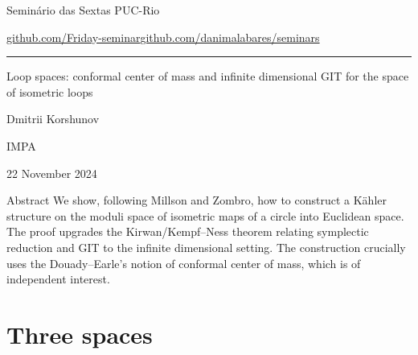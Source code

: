 


\begin{minipage}{\textwidth}
	\begin{minipage}{1\textwidth}
		Semin\'ario das Sextas \hfill PUC-Rio
		
		{\small\href{https://github.com/Friday-seminar/}{github.com/Friday-seminar}\hfill\href{https://github.com/danimalabares/seminars}{github.com/danimalabares/seminars}}
		\end{minipage}
\end{minipage}\vspace{.2cm}\hrule

\vspace{10pt}

{\Huge Loop spaces:}{\huge \hspace{.1em} conformal center of mass and infinite dimensional GIT for the space of isometric loops}

\hfill{\Large Dmitrii Korshunov}

\hfill{\Large IMPA}

\hfill{\large 22 November 2024}

\begin{thing4}{Abstract}
We show, following Millson and Zombro, how to construct a Kähler structure on the moduli space of isometric maps of a circle into Euclidean space. The proof upgrades the Kirwan/Kempf--Ness theorem relating symplectic reduction and GIT to the infinite dimensional setting. The construction crucially uses the Douady--Earle's notion of conformal center of mass, which is of independent interest.
\end{thing4}

\section{Three spaces}

